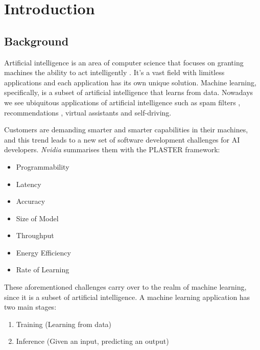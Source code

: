 \documentclass{report}
\def\mainmatter{%
    \pagenumbering{arabic}
    \setcounter{page}{1}
    \setcounter{section}{0}
    \renewcommand{\thesection}{\thechapter.\arabic{section}}
}%
\begin{document}
\setcounter{page}{2}
\tableofcontents

\newpage
{}
\listoffigures

\newpage
{}
\listoftables

\newpage
\mainmatter

\chapter{Introduction}

\section{Background}
Artificial intelligence is an area of computer science that focuses on granting machines the ability to act intelligently \cite{McCarthy2007}. It's a vast field with limitless applications and each application has its own unique solution. Machine learning, specifically, is a subset of artificial intelligence that learns from data. \cite{Mitchell1997} Nowadays we see ubiquitous applications of artificial intelligence such as spam filters \cite{Androutsopoulos2000},  recommendations \cite{lekakos2008hybrid}, virtual assistants and self-driving.

Customers are demanding smarter and smarter capabilities in their machines, and this trend leads to a new set of software development challenges for AI developers. \textit{Nvidia} summarises them with the PLASTER \cite{Teich2018} framework:
\begin{itemize}
  \item Programmability
  \item Latency
  \item Accuracy
  \item Size of Model
  \item Throughput
  \item Energy Efficiency
  \item Rate of Learning
\end{itemize}

These aforementioned challenges carry over to the realm of machine learning, since it is a subset of artificial intelligence. A machine learning application has two main stages:
\begin{enumerate}
  \item Training (Learning from data)
  \item Inference (Given an input, predicting an output)
\end{enumerate}
\end{document}
